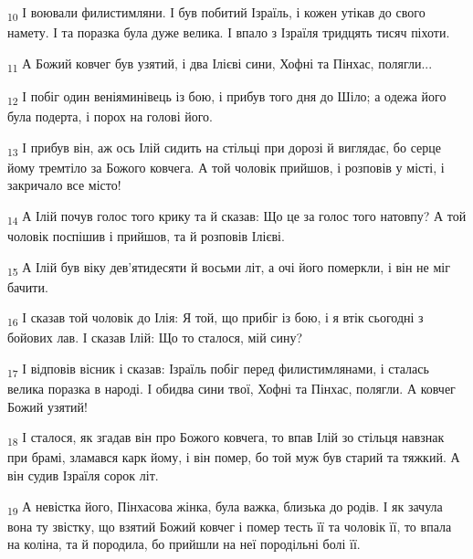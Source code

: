 \begin{tcolorbox}
\textsubscript{10} І воювали филистимляни. І був побитий Ізраїль, і кожен утікав до свого намету. І та поразка була дуже велика. І впало з Ізраїля тридцять тисяч піхоти.
\end{tcolorbox}
\begin{tcolorbox}
\textsubscript{11} А Божий ковчег був узятий, і два Ілієві сини, Хофні та Пінхас, полягли...
\end{tcolorbox}
\begin{tcolorbox}
\textsubscript{12} І побіг один веніяминівець із бою, і прибув того дня до Шіло; а одежа його була подерта, і порох на голові його.
\end{tcolorbox}
\begin{tcolorbox}
\textsubscript{13} І прибув він, аж ось Ілій сидить на стільці при дорозі й виглядає, бо серце йому тремтіло за Божого ковчега. А той чоловік прийшов, і розповів у місті, і закричало все місто!
\end{tcolorbox}
\begin{tcolorbox}
\textsubscript{14} А Ілій почув голос того крику та й сказав: Що це за голос того натовпу? А той чоловік поспішив і прийшов, та й розповів Ілієві.
\end{tcolorbox}
\begin{tcolorbox}
\textsubscript{15} А Ілій був віку дев'ятидесяти й восьми літ, а очі його померкли, і він не міг бачити.
\end{tcolorbox}
\begin{tcolorbox}
\textsubscript{16} І сказав той чоловік до Ілія: Я той, що прибіг із бою, і я втік сьогодні з бойових лав. І сказав Ілій: Що то сталося, мій сину?
\end{tcolorbox}
\begin{tcolorbox}
\textsubscript{17} І відповів вісник і сказав: Ізраїль побіг перед филистимлянами, і сталась велика поразка в народі. І обидва сини твої, Хофні та Пінхас, полягли. А ковчег Божий узятий!
\end{tcolorbox}
\begin{tcolorbox}
\textsubscript{18} І сталося, як згадав він про Божого ковчега, то впав Ілій зо стільця навзнак при брамі, зламався карк йому, і він помер, бо той муж був старий та тяжкий. А він судив Ізраїля сорок літ.
\end{tcolorbox}
\begin{tcolorbox}
\textsubscript{19} А невістка його, Пінхасова жінка, була важка, близька до родів. І як зачула вона ту звістку, що взятий Божий ковчег і помер тесть її та чоловік її, то впала на коліна, та й породила, бо прийшли на неї породільні болі її.
\end{tcolorbox}
